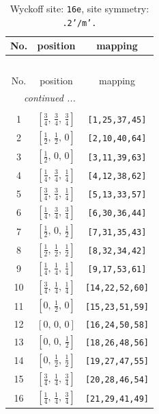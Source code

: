\documentclass[fleqn,8pt]{jsarticle}
\begin{document}
\renewcommand{\arraystretch}{1.2}
\begin{longtable}{ccc}
\caption{Wyckoff site: {\tt 16e}, site symmetry: {\tt .2'/m'.}}
 \\
 \hline \hline
No. & position & mapping \\ \hline \endfirsthead

\multicolumn{2}{l}{\tablename\ \thetable{}} \\
 \hline \hline
No. & position & mapping \\ \hline \endhead

 \hline \hline
\multicolumn{2}{r}{\footnotesize\it continued ...} \\ \endfoot

 \hline \hline
\multicolumn{2}{r}{} \\ \endlastfoot

1 & $\left[ \frac{3}{4},\, \frac{3}{4},\, \frac{3}{4} \right]$ & {\tt [1,25,37,45]} \\ \hline
2 & $\left[ \frac{1}{2},\, \frac{1}{2},\, 0 \right]$ & {\tt [2,10,40,64]} \\ \hline
3 & $\left[ \frac{1}{2},\, 0,\, 0 \right]$ & {\tt [3,11,39,63]} \\ \hline
4 & $\left[ \frac{1}{4},\, \frac{3}{4},\, \frac{1}{4} \right]$ & {\tt [4,12,38,62]} \\ \hline
5 & $\left[ \frac{3}{4},\, \frac{3}{4},\, \frac{1}{4} \right]$ & {\tt [5,13,33,57]} \\ \hline
6 & $\left[ \frac{1}{4},\, \frac{3}{4},\, \frac{3}{4} \right]$ & {\tt [6,30,36,44]} \\ \hline
7 & $\left[ \frac{1}{2},\, 0,\, \frac{1}{2} \right]$ & {\tt [7,31,35,43]} \\ \hline
8 & $\left[ \frac{1}{2},\, \frac{1}{2},\, \frac{1}{2} \right]$ & {\tt [8,32,34,42]} \\ \hline
9 & $\left[ \frac{1}{4},\, \frac{1}{4},\, \frac{1}{4} \right]$ & {\tt [9,17,53,61]} \\ \hline
10 & $\left[ \frac{3}{4},\, \frac{1}{4},\, \frac{1}{4} \right]$ & {\tt [14,22,52,60]} \\ \hline
11 & $\left[ 0,\, \frac{1}{2},\, 0 \right]$ & {\tt [15,23,51,59]} \\ \hline
12 & $\left[ 0,\, 0,\, 0 \right]$ & {\tt [16,24,50,58]} \\ \hline
13 & $\left[ 0,\, 0,\, \frac{1}{2} \right]$ & {\tt [18,26,48,56]} \\ \hline
14 & $\left[ 0,\, \frac{1}{2},\, \frac{1}{2} \right]$ & {\tt [19,27,47,55]} \\ \hline
15 & $\left[ \frac{3}{4},\, \frac{1}{4},\, \frac{3}{4} \right]$ & {\tt [20,28,46,54]} \\ \hline
16 & $\left[ \frac{1}{4},\, \frac{1}{4},\, \frac{3}{4} \right]$ & {\tt [21,29,41,49]} \\
\end{longtable}
\end{document}
